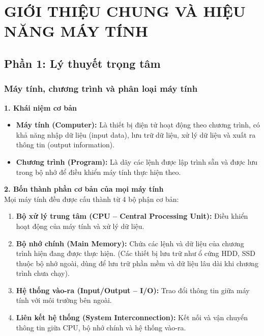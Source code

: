 \chapter{GIỚI THIỆU CHUNG VÀ HIỆU NĂNG MÁY TÍNH}

\section{Phần 1: Lý thuyết trọng tâm}

\subsection{Máy tính, chương trình và phân loại máy tính}

\textbf{1. Khái niệm cơ bản}
\begin{itemize}
    \item \textbf{Máy tính (Computer):} Là thiết bị điện tử hoạt động theo chương trình, có khả năng nhập dữ liệu (input data), lưu trữ dữ liệu, xử lý dữ liệu và xuất ra thông tin (output information).
    \item \textbf{Chương trình (Program):} Là dãy các lệnh được lập trình sẵn và được lưu trong bộ nhớ để điều khiển máy tính thực hiện theo.
\end{itemize}

\textbf{2. Bốn thành phần cơ bản của mọi máy tính}\\
Mọi máy tính đều được cấu thành từ 4 bộ phận cơ bản:
\begin{enumerate}
    \item \textbf{Bộ xử lý trung tâm (CPU -- Central Processing Unit):} Điều khiển hoạt động của máy tính và xử lý dữ liệu.
    \item \textbf{Bộ nhớ chính (Main Memory):} Chứa các lệnh và dữ liệu của chương trình hiện đang được thực hiện. (Các thiết bị lưu trữ như ổ cứng HDD, SSD thuộc bộ nhớ ngoài, dùng để lưu trữ phần mềm và dữ liệu lâu dài khi chương trình chưa chạy).
    \item \textbf{Hệ thống vào-ra (Input/Output -- I/O):} Trao đổi thông tin giữa máy tính với môi trường bên ngoài.
    \item \textbf{Liên kết hệ thống (System Interconnection):} Kết nối và vận chuyển thông tin giữa CPU, bộ nhớ chính và hệ thống vào-ra.
\end{enumerate}

